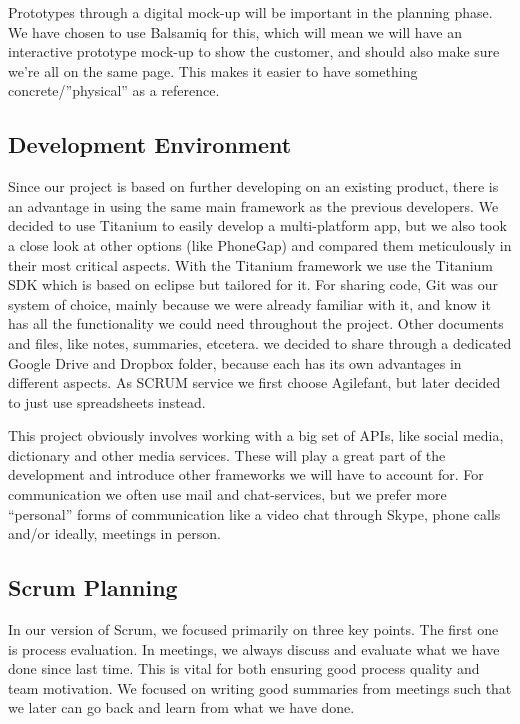 Prototypes through a digital mock-up will be important in the planning phase. We have chosen to use Balsamiq for this, which will mean we will have an interactive prototype mock-up to show the customer, and should also make sure we're all on the same page. This makes it easier to have something concrete/”physical” as a reference.

\subsection{Development Environment}

Since our project is based on further developing on an existing product, there is an advantage in using the same main framework as the previous developers. We decided to use Titanium to easily develop a multi-platform app, but we also took a close look at other options (like PhoneGap) and compared them meticulously in their most critical aspects. With the Titanium framework we use the Titanium SDK which is based on eclipse but tailored for it. For sharing code, Git was our system of choice, mainly because we were already familiar with it, and know it has all the functionality we could need throughout the project. Other documents and files, like notes, summaries, etcetera. we decided to share through a dedicated Google Drive and Dropbox folder, because each has its own advantages in different aspects. As SCRUM service we first choose Agilefant, but later decided to just use spreadsheets instead.

This project obviously involves working with a big set of APIs, like social media, dictionary and other media services. These will play a great part of the development and introduce other frameworks we will have to account for. For communication we often use mail and chat-services, but we prefer more “personal” forms of communication like a video chat through Skype, phone calls and/or ideally, meetings in person.

\subsection{Scrum Planning}
\label{sec:scrumPlanning}
In our version of Scrum, we focused primarily on three key points. The first one is process evaluation. In meetings, we always discuss and evaluate what we have done since last time. This is vital for both ensuring good process quality and team motivation. We focused on writing good summaries from meetings such that we later can go back and learn from what we have done.

